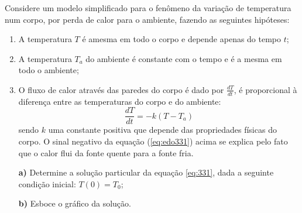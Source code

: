 \linespread{1.5}
Considere um modelo simplificado para o fenômeno da variação de temperatura num corpo, por perda de calor para o ambiente, fazendo as seguintes hipóteses:
\begin{enumerate}[I]
    \item A temperatura $T$ é amesma em todo o corpo e depende apenas do tempo $t$;
    \item A temperatura $T_a$ do ambiente é constante com o tempo e é a mesma em todo o ambiente;
    \item O fluxo de calor através das paredes do corpo é dado por $\frac{dT}{dt}$, é proporcional à diferença entre as temperaturas do corpo e do ambiente:
    \begin{equation}
        \frac{dT}{dt} = -k(T-T_a)
        \label{eq:edo331}
    \end{equation}
    sendo $k$ uma constante positiva que depende das propriedades físicas do corpo. O sinal negativo da equação (\ref{eq:edo331}) acima se explica pelo fato que o calor flui da fonte quente para a fonte fria.
\end{enumerate}
\begin{itemize}
    \item[\textbf{a)}] Determine a solução particular da equação \ref{eq:331}, dada a seguinte condição inicial:
    $T(0) = T_0$;
    \item[\textbf{b)}] Esboce o gráfico da solução.
\end{itemize}